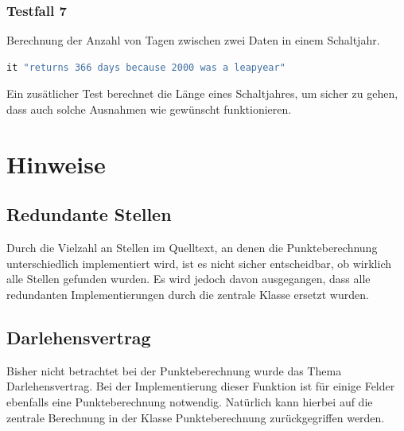 \documentclass[12pt]{scrreprt}
\begin{document}
\subsubsection{Testfall 7}
Berechnung der Anzahl von Tagen zwischen zwei Daten in einem Schaltjahr.
\begin{lstlisting}[language=Ruby]
it "returns 366 days because 2000 was a leapyear"
\end{lstlisting}
Ein zusätlicher Test berechnet die Länge eines Schaltjahres, um sicher zu gehen, dass auch solche Ausnahmen wie gewünscht funktionieren.

\section{Hinweise}

\subsection{Redundante Stellen}
Durch die Vielzahl an Stellen im Quelltext, an denen die Punkteberechnung unterschiedlich implementiert wird, ist es nicht sicher entscheidbar, ob wirklich alle Stellen gefunden wurden. Es wird jedoch davon ausgegangen, dass alle redundanten Implementierungen durch die zentrale Klasse ersetzt wurden.

\subsection{Darlehensvertrag} 
Bisher nicht betrachtet bei der Punkteberechnung wurde das Thema Darlehensvertrag. Bei der Implementierung dieser Funktion ist für einige Felder ebenfalls eine Punkteberechnung notwendig. Natürlich kann hierbei auf die zentrale Berechnung in der Klasse Punkteberechnung zurückgegriffen werden.
\end{document}
